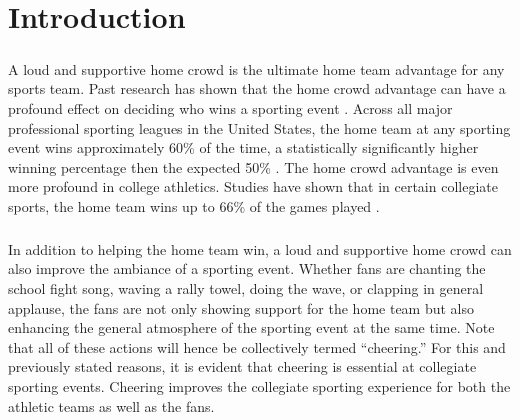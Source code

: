 \documentclass[oneside,12pt]{report}
\def\prefacesection#1{
\chapter*{#1}
\addcontentsline{toc}{chapter}{#1}
}
\begin{document}
\listoffigures



\renewcommand{\thefootnote}{\arabic{footnote}}
\setcounter{footnote}{0}

\prefacesection{Introduction}
\paragraph{}
A loud and supportive home crowd is the ultimate home team advantage for any sports team. Past research has shown that the home crowd advantage can have a profound effect on deciding who wins a sporting event \cite{Jamieson_2010}. Across all major professional sporting leagues in the United States, the home team at any sporting event wins approximately 60\% of the time, a statistically significantly higher winning percentage then the expected 50\% \cite{Jamieson_2010}. The home crowd advantage is even more profound in college athletics. Studies have shown that in certain collegiate sports, the home team wins up to 66\% of the games played \cite{Snyder_1985}.

\paragraph{}
In addition to helping the home team win, a loud and supportive home crowd can also improve the ambiance of a sporting event. Whether fans are chanting the school fight song, waving a rally towel, doing the wave, or clapping in general applause, the fans are not only showing support for the home team but also enhancing the general atmosphere of the sporting event at the same time. Note that all of these actions will hence be collectively termed ``cheering.'' For this and previously stated reasons, it is evident that cheering is essential at collegiate sporting events. Cheering improves the collegiate sporting experience for both the athletic teams as well as the fans. 
\end{document}
